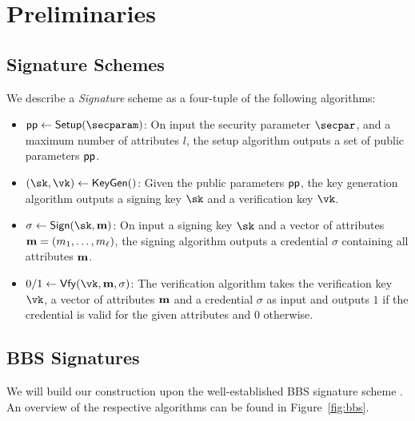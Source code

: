 \section{Preliminaries} \label{sec:prelims}

\subsection{Signature Schemes} \label{sec:prelims:sig}
We describe a \emph{Signature} scheme as a four-tuple of the following algorithms:
\begin{itemize}
    \item $\pubp\gets\Setup(\secparam)$: On input the security parameter $\secpar$, and a maximum number of attributes $l$, the setup algorithm outputs a set of public parameters $\mathsf{pp}$.
    \item $(\sk,\vk)\gets\KeyGen()$: Given the public parameters $\mathsf{pp}$, the key generation algorithm outputs a signing key $\sk$ and a verification key $\vk$.
    \item $\sigma\gets\Sign(\sk, \attr)$: On input a signing key $\sk$ and a vector of attributes $\mathbf{m}=(m_1,\ldots,m_\ell)$, the signing algorithm outputs a credential $\sigma$ containing all attributes $\mathbf{m}$.
    \item $0/1\gets \Vfy(\vk,\attr,\sigma)$: The verification algorithm takes the verification key $\vk$, a vector of attributes $\mathbf{m}$ and a credential $\sigma$ as input and outputs $1$ if the credential is valid for the given attributes and $0$ otherwise.
\end{itemize}

\subsection{BBS Signatures} \label{sec:prelims:bbs}
We will build our construction upon the well-established BBS signature scheme \cite{DBLP:conf/crypto/BonehBS04}\cite{DBLP:conf/eurocrypt/TessaroZ23a}. An overview of the respective algorithms can be found in Figure~\ref{fig:bbs}.

